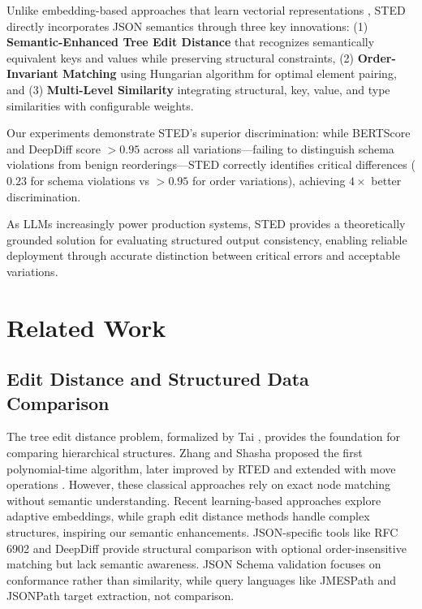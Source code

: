 \documentclass{article}
\begin{document}
Unlike embedding-based approaches that learn vectorial representations \cite{paassen2018tree}, STED directly incorporates JSON semantics through three key innovations: (1) \textbf{Semantic-Enhanced Tree Edit Distance} that recognizes semantically equivalent keys and values while preserving structural constraints, (2) \textbf{Order-Invariant Matching} using Hungarian algorithm for optimal element pairing, and (3) \textbf{Multi-Level Similarity} integrating structural, key, value, and type similarities with configurable weights.

Our experiments demonstrate STED's superior discrimination: while BERTScore and DeepDiff score $>0.95$ across all variations---failing to distinguish schema violations from benign reorderings---STED correctly identifies critical differences ($0.23$ for schema violations vs $>0.95$ for order variations), achieving $4\times$ better discrimination.

As LLMs increasingly power production systems, STED provides a theoretically grounded solution for evaluating structured output consistency, enabling reliable deployment through accurate distinction between critical errors and acceptable variations.
\vspace{-3mm}
\section{Related Work}
\vspace{-3mm}
\subsection{Edit Distance and Structured Data Comparison}
The tree edit distance problem, formalized by Tai \cite{Tai1979}, provides the foundation for comparing hierarchical structures. Zhang and Shasha \cite{Zhang1989} proposed the first polynomial-time algorithm, later improved by RTED \cite{Pawlik2011} and extended with move operations \cite{Chawathe1996}. However, these classical approaches rely on exact node matching without semantic understanding. Recent learning-based approaches \cite{paassen2018tree, paassen2022revisiting} explore adaptive embeddings, while graph edit distance methods \cite{jain2024graph, piao2023computing} handle complex structures, inspiring our semantic enhancements.
JSON-specific tools like RFC 6902 \cite{RFC6902} and DeepDiff \cite{seperman} provide structural comparison with optional order-insensitive matching but lack semantic awareness. JSON Schema validation \cite{Wright2022} focuses on conformance rather than similarity, while query languages like JMESPath \cite{JMESPath2014} and JSONPath \cite{Gessner2007} target extraction, not comparison.
\end{document}
